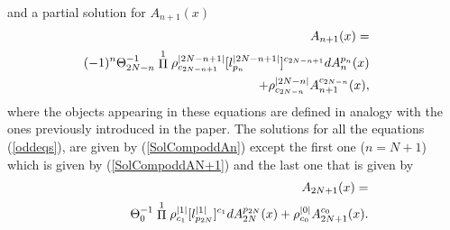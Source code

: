\documentclass[prd,a4paper,twocolumn,amssymb,amsmath,nofootinbib,showpacs]{revtex4}
\begin{document}
and a partial solution for $A_{n+1}(x)$
\begin{eqnarray}
&&\hspace{-.8cm}A_{n+1}(x)=\nonumber\\
&&\hspace{-.8cm}(-1)^n\Theta_{2N-n}^{-1}\stackrel{1}{\Pi}
\rho_{c_{2N-n+1}}^{|2N-n+1|} [l^{|2N-n+1|}_{p_n}]^{c_{2N-n+1}} dA_n^{p_n}(x)
\nonumber\\
&&\hspace{-.8cm}+
\rho_{c_{2N-n}}^{|2N-n|}A_{n+1}^{c_{2N-n}}(x),\label{SolParoddAn+1}
\end{eqnarray}
where the objects appearing in these equations are defined in
analogy with the ones previously introduced in the paper. The
solutions for all the equations (\ref{oddeqs}), are given by
(\ref{SolCompoddAn}) except the first one ($n=N+1$) which is given
by (\ref{SolCompoddAN+1}) and the last one that is given by
\begin{eqnarray}
&&\hspace{-.8cm}A_{2N+1}(x)=\label{soloddA2N+1}\\
&&\hspace{.5cm}\Theta_0^{-1}\stackrel{1}{\Pi}\rho_{c_1}^{|1|}
[l_{p_{2N}}^{|1|}]^{c_1}dA_{2N}^{p_{2N}}(x)+\rho_{c_0}^{|0|}A_{2N+1}^{c_0}(x).
\nonumber
\end{eqnarray}
\end{document}
